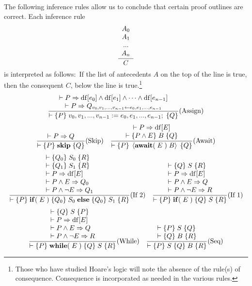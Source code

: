 \documentclass[muchmore,11pt]{article}%
\begin{document}
The following inference rules allow us to conclude that certain proof outlines
are correct. Each inference rule%
\[
\frac{%
\begin{array}
[c]{c}%
A_{0}\\
A_{1}\\
...\\
A_{n}%
\end{array}
}{C}%
\]
is interpreted as follows:\ If the list of antecedents $A$ on the top of the
line is true, then the consequent $C$, below the line is true.\footnote{Those
who have studied Hoare's logic will note the absence of the rule(s) of
consequence. Consequence is incorporated as needed in the various rules.}%
\[
\frac{%
\begin{array}
[c]{c}%
\vdash P\Rightarrow\mathrm{df}[e_{0}]\wedge\mathrm{df}[e_{1}]\wedge
\cdots\wedge\mathrm{df}[e_{n-1}]\\
\vdash P\Rightarrow Q_{v_{0},v_{1},...,v_{n-1}\leftarrow e_{0},e_{1}%
,...,e_{n-1}}%
\end{array}
}{\vdash\{P\}\;v_{0},v_{1},...,v_{n-1}:=e_{0},e_{1},...,e_{n-1};\;\{Q\}}%
\text{(Assign)}%
\]%
\[
\frac{\vdash P\Rightarrow Q}{\vdash\{P\}\;\mathbf{skip}\;\{Q\}}%
\text{(Skip)\quad}\frac{%
\begin{array}
[c]{c}%
\vdash P\Rightarrow\mathrm{df}[E]\\
\vdash\{P\wedge E\}\;B\;\{Q\}
\end{array}
}{\vdash\{P\}\;\left\langle \mathbf{await}(\;E\;)\;B\right\rangle
\;\{Q\}}\text{(Await)}%
\]%
\[
\frac{%
\begin{array}
[c]{l}%
\vdash\{Q_{0}\}\;S_{0}\;\{R\}\\
\vdash\{Q_{1}\}\;S_{1}\;\{R\}\\
\vdash P\Rightarrow\mathrm{df}[E]\\
\vdash P\wedge E\Rightarrow Q_{0}\\
\vdash P\wedge\lnot E\Rightarrow Q_{1}%
\end{array}
}{\vdash\{P\}\;\mathbf{if}(\;E\;)\;\{Q_{0}\}\;S_{0}\;\mathbf{else}%
\;\{Q_{0}\}\;S_{1}\;\{R\}}\text{(If 2)\quad}\frac{%
\begin{array}
[c]{l}%
\vdash\{Q\}\;S\;\{R\}\\
\vdash P\Rightarrow\mathrm{df}[E]\\
\vdash P\wedge E\Rightarrow Q\\
\vdash P\wedge\lnot E\Rightarrow R
\end{array}
}{\vdash\{P\}\;\mathbf{if}(\;E\;)\;\{Q\}\;S\;\{R\}}\text{(If 1)}%
\]%
\[
\frac{%
\begin{array}
[c]{l}%
\vdash\{Q\}\;S\;\{P\}\\
\vdash P\Rightarrow\mathrm{df}[E]\\
\vdash P\wedge E\Rightarrow Q\\
\vdash P\wedge\lnot E\Rightarrow R
\end{array}
}{\vdash\{P\}\;\mathbf{while}(\;E\;)\;\{Q\}\;S\;\{R\}}\text{(While)\quad}%
\frac{%
\begin{array}
[c]{l}%
\vdash\{P\}\;S\;\{Q\}\\
\vdash\{Q\}\;B\;\{R\}
\end{array}
}{\vdash\{P\}\;S\;\{Q\}\;B\;\{R\}}\text{(Seq)}%
\]%
\end{document}

